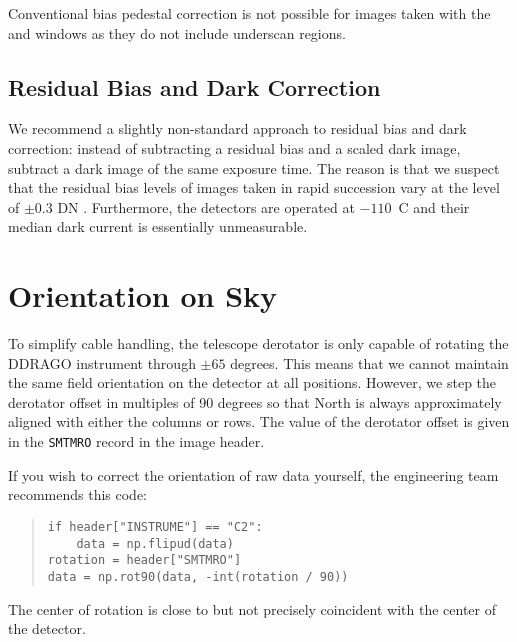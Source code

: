 Conventional bias pedestal correction is not possible for images taken with the  and  windows as they do not include underscan regions.

\subsection{Residual Bias and Dark Correction}

We recommend a slightly non-standard approach to residual bias and dark correction: instead of subtracting a residual bias and a scaled dark image, subtract a dark image of the same exposure time. The reason is that we suspect that the residual bias levels of images taken in rapid succession vary at the level of $\pm 0.3$ DN \citep{ohp}. Furthermore, the detectors are operated at $-110$~C and their median dark current is essentially unmeasurable.

\section{Orientation on Sky}

To simplify cable handling, the telescope derotator is only capable of rotating the DDRAGO instrument through $\pm65$ degrees. This means that we cannot maintain the same field orientation on the detector at all positions. However, we step the derotator offset in multiples of 90 degrees so that North is always approximately aligned with either the columns or rows. The value of the derotator offset is given in the \verb|SMTMRO| record in the image header.

If you wish to correct the orientation of raw data yourself, the engineering team recommends this code:
\begin{quote}\footnotesize\begin{verbatim}
if header["INSTRUME"] == "C2":
    data = np.flipud(data)
rotation = header["SMTMRO"]
data = np.rot90(data, -int(rotation / 90))
\end{verbatim}\end{quote}

The center of rotation is close to but not precisely coincident with the center of the detector.



